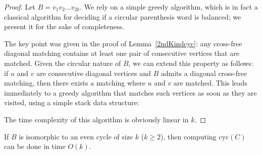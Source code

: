 \documentclass[10pt]{llncs}
\begin{document}
\begin{proof}
  Let $B = v_1v_2\ldots v_{2k}$. We rely on a simple greedy algorithm,
  which is in fact a classical algorithm for deciding if a circular
  parenthesis word is balanced; we present it for the sake of
  completeness.

  The key point was given in the proof of Lemma~\ref{2ndKindcyc}: any
  cross-free diagonal matching contains at least one pair of
  consecutive vertices that are matched. Given the circular nature of
  $B$, we can extend this property as follows: if $u$ and $v$ are
  consecutive diagonal vertices and $B$ admits a diagonal cross-free
  matching, then there exists a matching where $u$ and $v$ are
  matched. This leads immediately to a greedy algorithm that matches
  such vertices as soon as they are visited, using a simple stack data
  structure:
 




  \begin{center}
  \end{center}

  The time complexity of this algorithm is obviously linear in $k$.
\end{proof}


\begin{proposition}\label{cycles}
  If $B$ is isomorphic to an even cycle of size $k$ ($k\geq 2$), then
  computing $\text{cyc}(C)$ can be done in time $O(k)$.
\end{proposition} 
\end{document}
